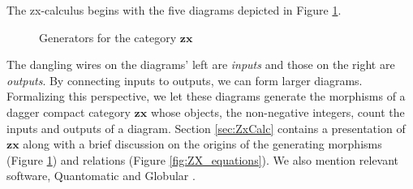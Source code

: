 The zx-calculus begins with 
the five diagrams depicted 
in Figure \ref{fig:ZX_generators}.
\begin{figure}
	\caption{Generators for the category $\mathbf{zx}$}
	\label{fig:ZX_generators}
\end{figure}
The dangling wires 
on the diagrams' left 
are \emph{inputs} and 
those on the right are \emph{outputs}. 
By connecting inputs to outputs, 
we can form larger diagrams.  
Formalizing this perspective, 
we let these diagrams 
generate the morphisms of 
a dagger compact category 
$\mathbf{zx}$ whose 
objects, the non-negative integers, 
count the inputs and outputs
of a diagram.  
Section 
	\ref{sec:ZxCalc} 
contains a presentation of $\mathbf{zx}$ 
along with a brief discussion on 
the origins of the generating morphisms 
(Figure \ref{fig:ZX_generators}) 
and relations (Figure \ref{fig:ZX_equations}). 
We also mention relevant software, 
Quantomatic 
	\cite{AbramCoecke_CatSemanticQuantum,
		KissingerZamd_Quantomatic} 
and Globular 
	\cite{BarKissingerVicary_Globular}.  

